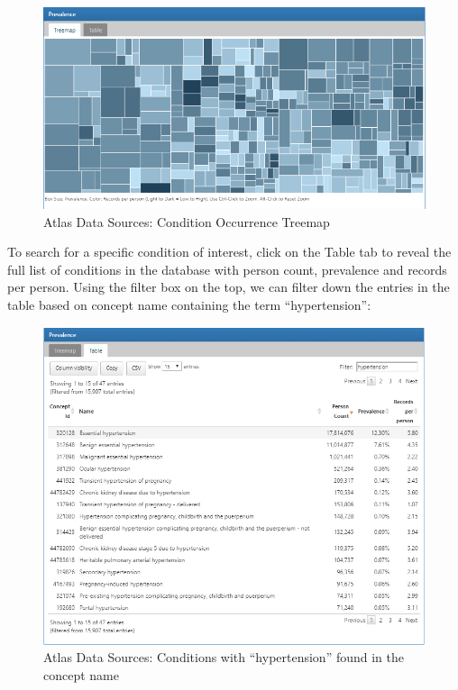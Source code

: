 \documentclass[11pt]{book}
\theoremstyle{definition}
\theoremstyle{definition}
\theoremstyle{definition}
\theoremstyle{remark}
\begin{document}
\begin{figure}

{\centering \includegraphics[width=1\linewidth]{images/Characterization/atlasDataSourcesConditionTreemap} 

}

\caption{Atlas Data Sources: Condition Occurrence Treemap}\label{fig:atlasDataSourcesConditionTreemap}
\end{figure}

To search for a specific condition of interest, click on the Table tab to reveal the full list of conditions in the database with person count, prevalence and records per person. Using the filter box on the top, we can filter down the entries in the table based on concept name containing the term ``hypertension'':

\begin{figure}

{\centering \includegraphics[width=1\linewidth]{images/Characterization/atlasDataSourcesConditionFiltered} 

}

\caption{Atlas Data Sources: Conditions with “hypertension” found in the concept name}\label{fig:atlasDataSourcesConditionFiltered}
\end{figure}
\end{document}
